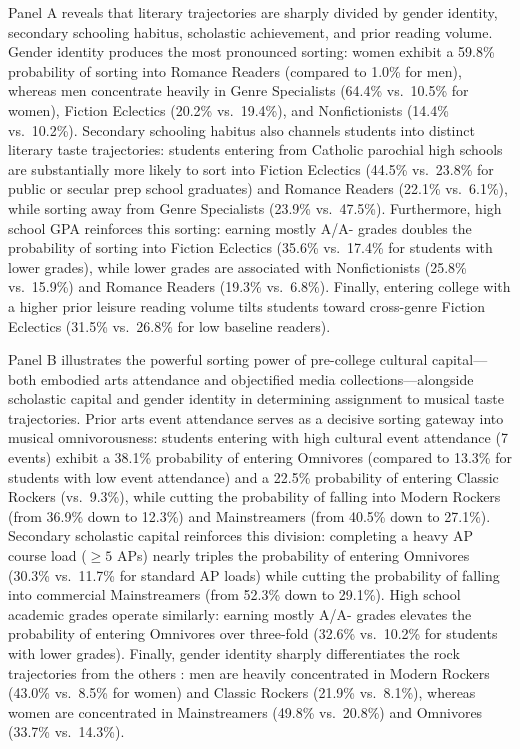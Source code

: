 \documentclass[12pt]{article}
\begin{document}
Panel A reveals that literary trajectories are sharply divided by gender identity, secondary schooling habitus, scholastic achievement, and prior reading volume. Gender identity produces the most pronounced sorting: women exhibit a 59.8\% probability of sorting into Romance Readers (compared to 1.0\% for men), whereas men concentrate heavily in Genre Specialists (64.4\% vs.\ 10.5\% for women), Fiction Eclectics (20.2\% vs.\ 19.4\%), and Nonfictionists (14.4\% vs.\ 10.2\%). Secondary schooling habitus also channels students into distinct literary taste trajectories: students entering from Catholic parochial high schools are substantially more likely to sort into Fiction Eclectics (44.5\% vs.\ 23.8\% for public or secular prep school graduates) and Romance Readers (22.1\% vs.\ 6.1\%), while sorting away from Genre Specialists (23.9\% vs.\ 47.5\%). Furthermore, high school GPA reinforces this sorting: earning mostly A/A- grades doubles the probability of sorting into Fiction Eclectics (35.6\% vs.\ 17.4\% for students with lower grades), while lower grades are associated with Nonfictionists (25.8\% vs.\ 15.9\%) and Romance Readers (19.3\% vs.\ 6.8\%). Finally, entering college with a higher prior leisure reading volume tilts students toward cross-genre Fiction Eclectics (31.5\% vs.\ 26.8\% for low baseline readers).

Panel B illustrates the powerful sorting power of pre-college cultural capital---both embodied arts attendance and objectified media collections---alongside scholastic capital and gender identity in determining assignment to musical taste trajectories. Prior arts event attendance serves as a decisive sorting gateway into musical omnivorousness: students entering with high cultural event attendance (7 events) exhibit a 38.1\% probability of entering Omnivores (compared to 13.3\% for students with low event attendance) and a 22.5\% probability of entering Classic Rockers (vs.\ 9.3\%), while cutting the probability of falling into Modern Rockers (from 36.9\% down to 12.3\%) and Mainstreamers (from 40.5\% down to 27.1\%). Secondary scholastic capital reinforces this division: completing a heavy AP course load ($\ge 5$ APs) nearly triples the probability of entering Omnivores (30.3\% vs.\ 11.7\% for standard AP loads) while cutting the probability of falling into commercial Mainstreamers (from 52.3\% down to 29.1\%). High school academic grades operate similarly: earning mostly A/A- grades elevates the probability of entering Omnivores over three-fold (32.6\% vs.\ 10.2\% for students with lower grades). Finally, gender identity sharply differentiates the rock trajectories from the others \citep{ma2026deep,carbone2024adolescents}: men are heavily concentrated in Modern Rockers (43.0\% vs.\ 8.5\% for women) and Classic Rockers (21.9\% vs.\ 8.1\%), whereas women are concentrated in Mainstreamers (49.8\% vs.\ 20.8\%) and Omnivores (33.7\% vs.\ 14.3\%). 
\end{document}
